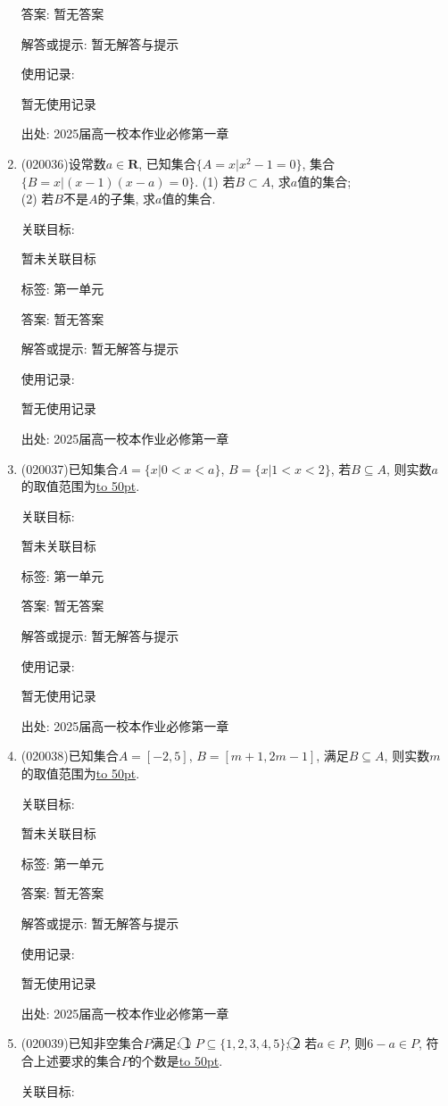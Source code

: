 \documentclass[10pt,a4paper]{article}
\newcommand{\blank}[1]{\underline{\hbox to #1pt{}}}
\begin{document}
\begin{enumerate}[1.]
答案: 暂无答案

解答或提示: 暂无解答与提示

使用记录:

暂无使用记录


出处: 2025届高一校本作业必修第一章
\item { (020036)}设常数$a\in \mathbf{R}$, 已知集合$\{A=x|x^2-1=0\}$, 集合$\{B=x|(x-1)(x-a)=0\}$.
(1) 若$B\subset A$, 求$a$值的集合;\\
(2) 若$B$不是$A$的子集, 求$a$值的集合.


关联目标:

暂未关联目标



标签: 第一单元

答案: 暂无答案

解答或提示: 暂无解答与提示

使用记录:

暂无使用记录


出处: 2025届高一校本作业必修第一章
\item { (020037)}已知集合$A=\{x|0<x<a\}$, $B=\{x|1<x<2\}$, 若$B\subseteq A$, 则实数$a$的取值范围为\blank{50}.


关联目标:

暂未关联目标



标签: 第一单元

答案: 暂无答案

解答或提示: 暂无解答与提示

使用记录:

暂无使用记录


出处: 2025届高一校本作业必修第一章
\item { (020038)}已知集合$A=[-2,5]$, $B=[m+1,2m-1]$, 满足$B\subseteq A$, 则实数$m$的取值范围为\blank{50}.


关联目标:

暂未关联目标



标签: 第一单元

答案: 暂无答案

解答或提示: 暂无解答与提示

使用记录:

暂无使用记录


出处: 2025届高一校本作业必修第一章
\item { (020039)}已知非空集合$P$满足: \textcircled{1} $P\subseteq \{1,2,3,4,5\}$; \textcircled{2} 若$a\in P$, 则$6-a\in P$, 符合上述要求的集合$P$的个数是\blank{50}.


关联目标:


\end{enumerate}
\end{document}
